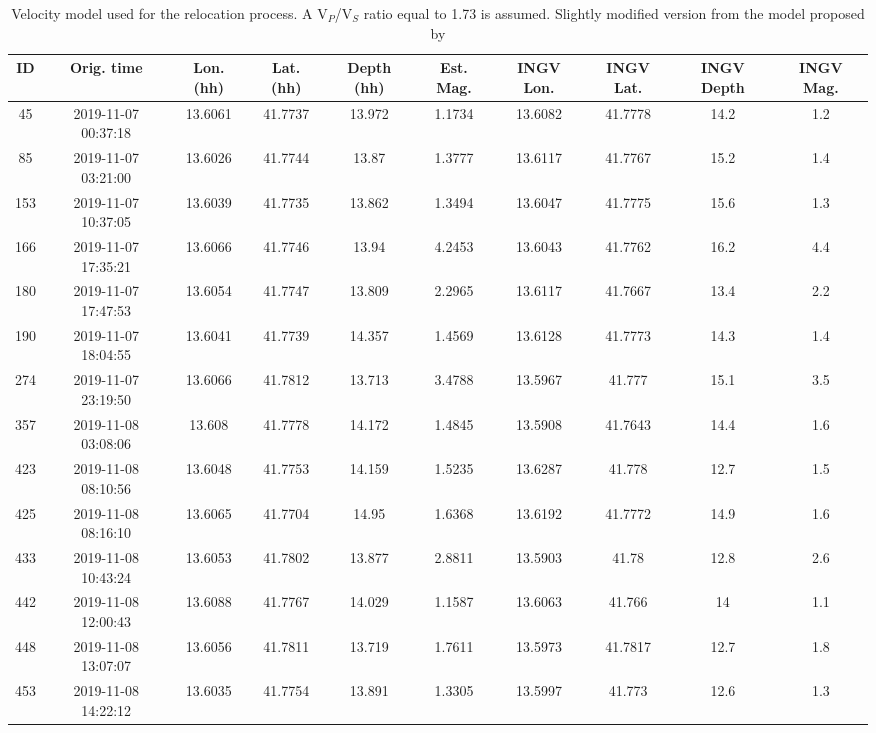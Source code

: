 \documentclass[a4paper,12pt]{article}
\begin{document}
\begin{landscape}

\begin{table}
\renewcommand{\thetable}{S\arabic{table}}
 \caption{Velocity model used for the relocation process. A V$_P$/V$_S$ ratio equal to 1.73 is assumed. Slightly modified version from the model proposed by \cite{Bagh_2007_BSC}}
 \begin{center}
 \begin{tabular}{@{} c c c c c c c c c c}
\hline
ID & Orig. time & Lon. (hh) & Lat. (hh) & Depth (hh) & Est. Mag. & INGV Lon. & INGV Lat. & INGV Depth & INGV Mag. \\
\hline 
45 & 2019-11-07 00:37:18 & 13.6061 & 41.7737 & 13.972 & 1.1734 & 13.6082 & 41.7778 & 14.2 & 1.2 \\
85 & 2019-11-07 03:21:00 & 13.6026 & 41.7744 & 13.87 & 1.3777 & 13.6117 & 41.7767 & 15.2 & 1.4 \\
153 & 2019-11-07 10:37:05 & 13.6039 & 41.7735 & 13.862 & 1.3494 & 13.6047 & 41.7775 & 15.6 & 1.3 \\
166 & 2019-11-07 17:35:21 & 13.6066 & 41.7746 & 13.94 & 4.2453 & 13.6043 & 41.7762 & 16.2 & 4.4 \\
180 & 2019-11-07 17:47:53 & 13.6054 & 41.7747 & 13.809 & 2.2965 & 13.6117 & 41.7667 & 13.4 & 2.2 \\
190 & 2019-11-07 18:04:55 & 13.6041 & 41.7739 & 14.357 & 1.4569 & 13.6128 & 41.7773 & 14.3 & 1.4 \\
274 & 2019-11-07 23:19:50 & 13.6066 & 41.7812 & 13.713 & 3.4788 & 13.5967 & 41.777 & 15.1 & 3.5 \\
357 & 2019-11-08 03:08:06 & 13.608 & 41.7778 & 14.172 & 1.4845 & 13.5908 & 41.7643 & 14.4 & 1.6 \\
423 & 2019-11-08 08:10:56 & 13.6048 & 41.7753 & 14.159 & 1.5235 & 13.6287 & 41.778 & 12.7 & 1.5 \\
425 & 2019-11-08 08:16:10 & 13.6065 & 41.7704 & 14.95 & 1.6368 & 13.6192 & 41.7772 & 14.9 & 1.6 \\
433 & 2019-11-08 10:43:24 & 13.6053 & 41.7802 & 13.877 & 2.8811 & 13.5903 & 41.78 & 12.8 & 2.6 \\
442 & 2019-11-08 12:00:43 & 13.6088 & 41.7767 & 14.029 & 1.1587 & 13.6063 & 41.766 & 14 & 1.1 \\
448 & 2019-11-08 13:07:07 & 13.6056 & 41.7811 & 13.719 & 1.7611 & 13.5973 & 41.7817 & 12.7 & 1.8 \\
453 & 2019-11-08 14:22:12 & 13.6035 & 41.7754 & 13.891 & 1.3305 & 13.5997 & 41.773 & 12.6 & 1.3 \\

\end{tabular}
\end{center}
\end{table}
\end{landscape}
\end{document}

